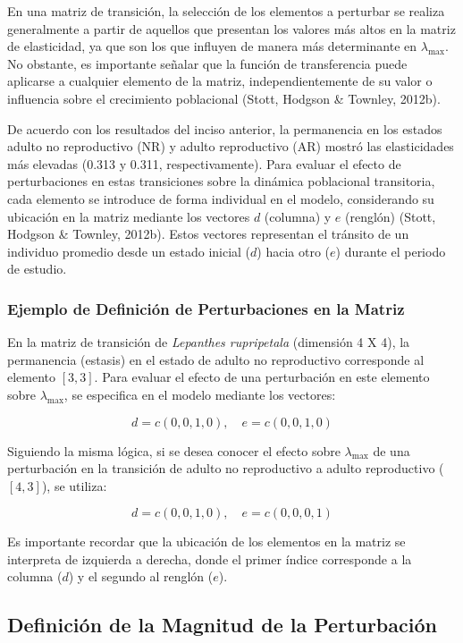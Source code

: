 \documentclass[
  12pt,
  letterpaper,
]{book}
\begin{document}
En una matriz de transición, la selección de los elementos a perturbar
se realiza generalmente a partir de aquellos que presentan los valores
más altos en la matriz de elasticidad, ya que son los que influyen de
manera más determinante en \(⁡\lambda_{\max}\). No obstante, es
importante señalar que la función de transferencia puede aplicarse a
cualquier elemento de la matriz, independientemente de su valor o
influencia sobre el crecimiento poblacional (Stott, Hodgson \& Townley,
2012b).

De acuerdo con los resultados del inciso anterior, la permanencia en los
estados adulto no reproductivo (NR) y adulto reproductivo (AR) mostró
las elasticidades más elevadas (0.313 y 0.311, respectivamente). Para
evaluar el efecto de perturbaciones en estas transiciones sobre la
dinámica poblacional transitoria, cada elemento se introduce de forma
individual en el modelo, considerando su ubicación en la matriz mediante
los vectores \(d\) (columna) y \(e\) (renglón) (Stott, Hodgson \&
Townley, 2012b). Estos vectores representan el tránsito de un individuo
promedio desde un estado inicial (\(d\)) hacia otro (\(e\)) durante el
periodo de estudio.

\subsubsection{Ejemplo de Definición de Perturbaciones en la
Matriz}\label{ejemplo-de-definiciuxf3n-de-perturbaciones-en-la-matriz}

En la matriz de transición de \emph{Lepanthes rupripetala} (dimensión 4
X 4), la permanencia (estasis) en el estado de adulto no reproductivo
corresponde al elemento \([3,3]\). Para evaluar el efecto de una
perturbación en este elemento sobre \(⁡\lambda_{\max}\), se especifica en
el modelo mediante los vectores:

\[d = c(0, 0, 1, 0), \quad e = c(0, 0, 1, 0)\]

Siguiendo la misma lógica, si se desea conocer el efecto sobre
\(\lambda_{\max}\) de una perturbación en la transición de adulto no
reproductivo a adulto reproductivo (\([4,3]\)), se utiliza:

\[d = c(0, 0, 1, 0), \quad e = c(0, 0, 0, 1)\]

Es importante recordar que la ubicación de los elementos en la matriz se
interpreta de izquierda a derecha, donde el primer índice corresponde a
la columna (\(d\)) y el segundo al renglón (\(e\)).

\subsection{Definición de la Magnitud de la
Perturbación}\label{definiciuxf3n-de-la-magnitud-de-la-perturbaciuxf3n}
\end{document}
